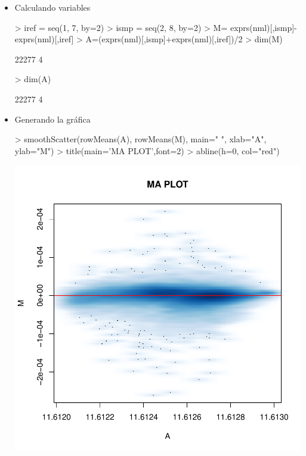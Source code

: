 \documentclass[12pt]{article}
\begin{document}
\begin{itemize}
\item{Calculando variables}
\begin{Schunk}
\begin{Sinput}
> iref = seq(1, 7, by=2)
> ismp = seq(2, 8, by=2)
> M= exprs(nml)[,ismp]-exprs(nml)[,iref]
> A=(exprs(nml)[,ismp]+exprs(nml)[,iref])/2
> dim(M)
\end{Sinput}
\begin{Soutput}
[1] 22277     4
\end{Soutput}
\begin{Sinput}
> dim(A)
\end{Sinput}
\begin{Soutput}
[1] 22277     4
\end{Soutput}
\end{Schunk}
\item{Generando la gráfica}
\begin{Schunk}
\begin{Sinput}
> smoothScatter(rowMeans(A), rowMeans(M), main=" ", xlab="A", ylab="M")
> title(main='MA PLOT',font=2)
> abline(h=0, col="red")
\end{Sinput}
\end{Schunk}
\includegraphics{JuanHenao_Taller3-007}
\end{itemize}
\end{document}

